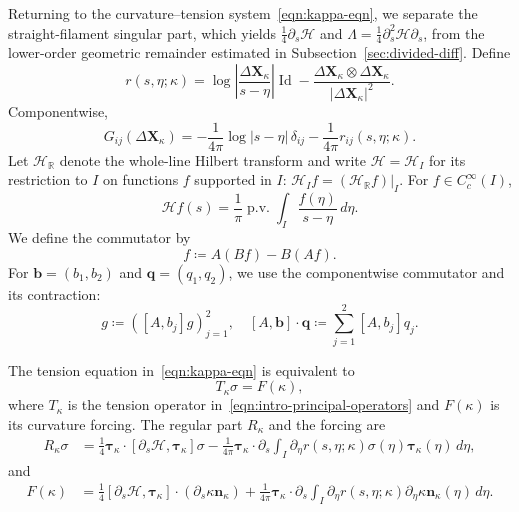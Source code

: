 \documentclass[11pt,reqno]{amsart}
\theoremstyle{plain}
\theoremstyle{definition}
\numberwithin{equation}{section}
\DeclareMathOperator{\Id}{Id}
\newcommand{\p}{\partial}
\newcommand{\mc}[1]{\mathcal{#1}}
\newcommand{\bm}[1]{\boldsymbol{#1}}
\newcommand{\abs}[1]{\left\lvert #1 \right\rvert}
\newcommand{\R}{\mathbb{R}}
\newcommand{\tk}{\bm\tau_\kappa}
\newcommand{\nk}{\bm n_\kappa}
\newcommand{\xk}{\bm X_\kappa}
\begin{document}
Returning to the curvature--tension system~\eqref{eqn:kappa-eqn}, we separate
the straight-filament singular part, which yields $\frac14\p_s\mc H$
and $\Lambda=\frac14\p_s^2\mc H\p_s$, from the lower-order geometric
remainder estimated in Subsection~\ref{sec:divided-diff}. Define
\begin{equation}\label{eqn:R-kernel}
    r(s,\eta;\kappa) = \log\abs{\frac{\Delta\xk}{s-\eta} } \Id - \frac{ \Delta\xk \otimes \Delta\xk }{|\Delta\xk |^2}.
\end{equation}
Componentwise,
\begin{equation}\label{eqn:stokeslet-splitting}
    G_{ij}(\Delta\xk)
    =-\frac{1}{4\pi}\log\abs{s-\eta}\,\delta_{ij}
    -\frac{1}{4\pi}r_{ij}(s,\eta;\kappa).
\end{equation}
Let $\mc H_{\R}$ denote the whole-line Hilbert transform and write
$\mc H=\mc H_I$ for its restriction to $I$ on functions $f$ supported in $I$:
$\mc H_I f=(\mc H_{\R}f)|_I$. For $f\in C_c^\infty(I)$,
\begin{equation}\label{eqn:finite-hilbert-definition}
    \mc Hf(s) = \frac{1}{\pi}\operatorname{p.v.} \int_I \frac{f(\eta)}{s-\eta} \,d\eta.
\end{equation}
We define the commutator by
\begin{equation}
    [A,B] f \coloneqq A(Bf)-B(Af).
\end{equation}
For $\bm b=(b_1,b_2)$ and $\bm q=(q_1,q_2)$, we use the componentwise
commutator and its contraction:
\begin{equation*}
    [A,\bm b]g\coloneqq([A,b_j]g)_{j=1}^2,
    \quad
    [A,\bm b]\cdot\bm q\coloneqq\sum_{j=1}^2[A,b_j]q_j.
\end{equation*}


The tension equation in~\eqref{eqn:kappa-eqn} is equivalent to
\begin{equation}\label{eqn:ten-det}
    T_\kappa\sigma=F(\kappa),
\end{equation}
where $T_\kappa$ is the tension operator
in~\eqref{eqn:intro-principal-operators} and $F(\kappa)$ is its curvature
forcing. The regular part $R_\kappa$ and the forcing are
\begin{equation}
\begin{aligned}
    R_\kappa\sigma
    &= \frac{1}{4}\tk \cdot [\p_s \mc H, \tk]\sigma
    - \frac{1}{4\pi} \tk\cdot\p_s\int_I
    \p_\eta r(s,\eta;\kappa)\sigma(\eta)\tk(\eta)\,d\eta,
\end{aligned}
\label{eqn:Rop-def}
\end{equation}
and
\begin{equation}\label{eqn:F-kappa}
\begin{aligned}
    F(\kappa)
    &= \frac{1}{4}[\p_s\mc H, \tk]\cdot(\p_s\kappa\nk)
    + \frac{1}{4\pi}\tk\cdot\p_s\int_I
    \p_\eta r(s,\eta;\kappa)\p_\eta\kappa\nk(\eta)\,d\eta.
\end{aligned}
\end{equation}
\end{document}
